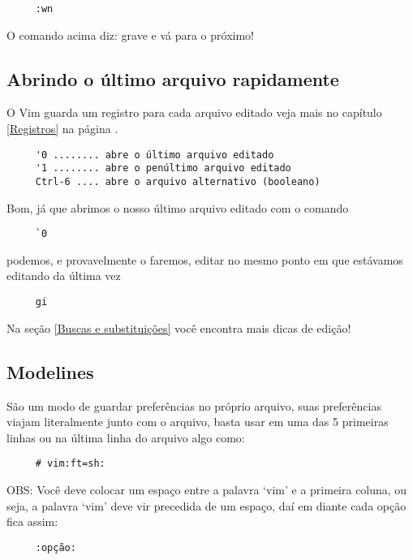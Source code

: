 \begin{verbatim}
     :wn
\end{verbatim}

O comando acima diz: grave e vá para o próximo!


\subsection{Abrindo o último arquivo rapidamente}
O Vim guarda um registro para cada arquivo editado veja
mais no capítulo \ref{Registros} na página \pageref{Registros}.

\begin{verbatim}
     '0 ........ abre o último arquivo editado
     '1 ........ abre o penúltimo arquivo editado
     Ctrl-6 .... abre o arquivo alternativo (booleano)
\end{verbatim}

Bom, já que abrimos o nosso último arquivo editado com o comando

\begin{verbatim}
     `0
\end{verbatim}

podemos, e provavelmente o faremos, editar no mesmo ponto em que estávamos
editando da última vez

\begin{verbatim}
     gi
\end{verbatim}

Na seção \ref{Buscas e substituições} você encontra mais dicas de edição!


\subsection{Modelines}\label{sec:Modelines}

São um modo de guardar preferências no próprio arquivo, suas
preferências viajam literalmente junto com o arquivo, basta usar em
uma das 5 primeiras linhas ou na última linha do arquivo algo
como:

\begin{verbatim}
     # vim:ft=sh:
\end{verbatim}

OBS: Você deve colocar um espaço entre a palavra `vim' e a primeira
coluna, ou seja, a palavra `vim' deve vir precedida de um espaço, daí
em diante cada opção fica assim:

\begin{verbatim}
     :opção:
\end{verbatim}

